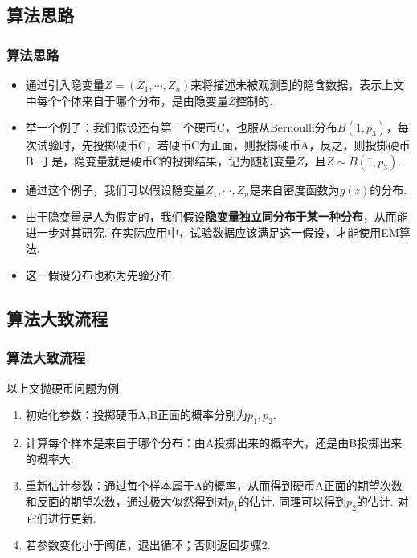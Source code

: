 \documentclass[UTF8]{ctexbeamer}
\numberwithin{equation}{section}  %
\begin{document}
\subsection{算法思路}
\begin{frame}
    \frametitle{算法思路}

    \begin{itemize}
        \item<1-> 通过引入隐变量$Z = (Z_1,\cdots ,Z_n)$来将描述未被观测到的隐含数据，表示上文中每个个体来自于哪个分布，是由隐变量$Z$控制的.
        \item<2-> 举一个例子：我们假设还有第三个硬币C，也服从Bernoulli分布$B(1,p_3)$，每次试验时，先投掷硬币C，若硬币C为正面，则投掷硬币A，反之，则投掷硬币B. 于是，隐变量就是硬币C的投掷结果，记为随机变量$Z$，且$Z\sim B(1,p_3)$.
        \item<3-> 通过这个例子，我们可以假设隐变量$Z_1,\cdots, Z_n$是来自密度函数为$g(z)$的分布.
        \item<3-> 由于隐变量是人为假定的，我们假设\textbf{隐变量独立同分布于某一种分布}，从而能进一步对其研究. 在实际应用中，试验数据应该满足这一假设，才能使用EM算法.
        \item<3-> 这一假设分布也称为先验分布.
    \end{itemize}

\end{frame}

\subsection{算法大致流程}
\begin{frame}
    \frametitle{算法大致流程}
    以上文抛硬币问题为例
    \begin{enumerate}[<+->]
        \item 初始化参数：投掷硬币A,B正面的概率分别为$p_1,p_2$.
        \item 计算每个样本是来自于哪个分布：由A投掷出来的概率大，还是由B投掷出来的概率大.
        \item 重新估计参数：通过每个样本属于A的概率，从而得到硬币A正面的期望次数和反面的期望次数，通过极大似然得到对$p_1$的估计. 同理可以得到$p_2$的估计. 对它们进行更新.
        \item 若参数变化小于阈值，退出循环；否则返回步骤2.
    \end{enumerate}
\end{frame}
\end{document}
